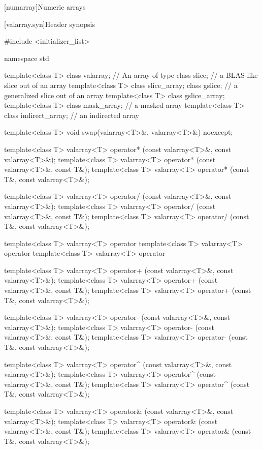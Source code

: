 [numarray]{Numeric arrays}

[valarray.syn]{Header  synopsis}
%
\begin{codeblock}
#include <initializer_list>

namespace std {

  template<class T> class valarray;         // An array of type 
  class slice;                              // a BLAS-like slice out of an array
  template<class T> class slice_array;
  class gslice;                             // a generalized slice out of an array
  template<class T> class gslice_array;
  template<class T> class mask_array;       // a masked array
  template<class T> class indirect_array;   // an indirected array

  template<class T> void swap(valarray<T>&, valarray<T>&) noexcept;

  template<class T> valarray<T> operator* (const valarray<T>&, const valarray<T>&);
  template<class T> valarray<T> operator* (const valarray<T>&, const T&);
  template<class T> valarray<T> operator* (const T&, const valarray<T>&);

  template<class T> valarray<T> operator/ (const valarray<T>&, const valarray<T>&);
  template<class T> valarray<T> operator/ (const valarray<T>&, const T&);
  template<class T> valarray<T> operator/ (const T&, const valarray<T>&);

  template<class T> valarray<T> operator%
  template<class T> valarray<T> operator%
  template<class T> valarray<T> operator%

  template<class T> valarray<T> operator+ (const valarray<T>&, const valarray<T>&);
  template<class T> valarray<T> operator+ (const valarray<T>&, const T&);
  template<class T> valarray<T> operator+ (const T&, const valarray<T>&);

  template<class T> valarray<T> operator- (const valarray<T>&, const valarray<T>&);
  template<class T> valarray<T> operator- (const valarray<T>&, const T&);
  template<class T> valarray<T> operator- (const T&, const valarray<T>&);

  template<class T> valarray<T> operator^ (const valarray<T>&, const valarray<T>&);
  template<class T> valarray<T> operator^ (const valarray<T>&, const T&);
  template<class T> valarray<T> operator^ (const T&, const valarray<T>&);

  template<class T> valarray<T> operator& (const valarray<T>&, const valarray<T>&);
  template<class T> valarray<T> operator& (const valarray<T>&, const T&);
  template<class T> valarray<T> operator& (const T&, const valarray<T>&);

}
\end{codeblock}
